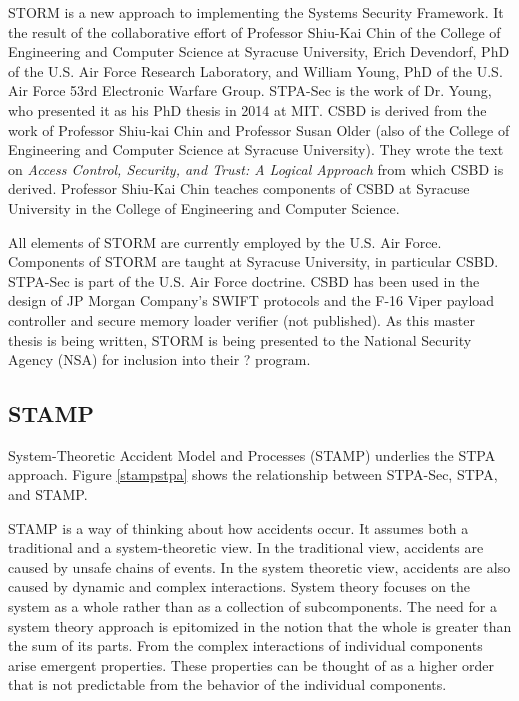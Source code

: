 \documentclass[../../main/main.tex]{subfiles}
\begin{document}
STORM is a new approach to implementing the Systems Security Framework.  It the result of the collaborative effort of Professor Shiu-Kai Chin of the College of Engineering and Computer Science at Syracuse University, Erich Devendorf, PhD of the U.S. Air Force Research Laboratory, and William Young, PhD of the U.S. Air Force 53rd Electronic Warfare Group.  STPA-Sec is the work of Dr. Young, who presented it as his PhD thesis in 2014 at MIT.  CSBD is derived from the work of Professor Shiu-kai Chin and Professor Susan Older (also of the College of Engineering and Computer Science at Syracuse University).  They wrote the text on \textit{Access Control, Security, and Trust: A Logical Approach} \cite{csbd} from which CSBD is derived.  Professor Shiu-Kai Chin teaches components of CSBD at Syracuse University in the College of Engineering and Computer Science.  


All elements of STORM are currently employed by the U.S. Air Force.  Components of STORM are taught at Syracuse University, in particular CSBD.  STPA-Sec is part of the U.S. Air Force doctrine.  CSBD has been used in the design of JP Morgan Company's SWIFT protocols \cite{} and the F-16 Viper payload controller and secure memory loader verifier (not published). As this master thesis is being written, STORM is being presented to the National Security Agency (NSA) for inclusion into their ? program.


\subsection{STAMP}\label{ssec:stamp}
System-Theoretic Accident Model and Processes (STAMP) underlies the STPA approach.  Figure \ref{stampstpa} shows the relationship between STPA-Sec, STPA, and STAMP.


STAMP is a way of thinking about how accidents occur.  It assumes both a traditional and a system-theoretic view.  In the traditional view, accidents are caused by unsafe chains of events.  In the system theoretic view, accidents are also caused by dynamic and complex interactions. System theory focuses on the system as a whole rather than as a collection of subcomponents.  The need for a system theory approach is epitomized in the notion that the whole is greater than the sum of its parts.  From the complex interactions of individual components arise emergent properties. These properties can be thought of as a higher order that is not predictable from the behavior of the individual components.
\end{document}
